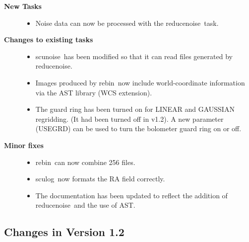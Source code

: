 \documentclass[twoside,11pt]{article}
\newcommand{\task}[1]{{\sf #1}}
\newcommand{\renoise}{\htmlref{\task{reduce\_noise}}{REDUCE_NOISE}}
\newcommand{\rebin}{\htmlref{\task{rebin}}{REBIN}}
\newcommand{\sculog}{\htmlref{\task{sculog}}{SCULOG}}
\newcommand{\scunoise}{\htmlref{\task{scunoise}}{SCUNOISE}}
\newcommand{\htmlref}[2]{#1}
\renewcommand{\_}{\texttt{\symbol{95}}}
\begin{document}
\begin{description}

\item[\textbf{New Tasks}] \mbox{}

\begin{itemize}
\item Noise data can now be processed with the \renoise\ task. 
\end{itemize}

\item[\textbf{Changes to existing tasks}] \mbox{}
\begin{itemize}
\item \scunoise\ has been modified so that it can read files generated by
\renoise.
\item Images produced by \rebin\ now include world-coordinate information via
the AST library (WCS extension).
\item The guard ring has been turned on for LINEAR and GAUSSIAN regridding.
    (It had been turned off in v1.2). A new parameter (USEGRD) can be used
    to turn the bolometer guard ring on or off.

\end{itemize}

\item[\textbf{Minor fixes}] \mbox{}
\begin{itemize}
\item \rebin\ can now combine 256 files.
\item \sculog\ now formats the RA field correctly.
\item The documentation has been updated to reflect the addition of \renoise\
and the use of AST.
\end{itemize}

\end{description}

\subsection{Changes in Version 1.2}
\end{document}
